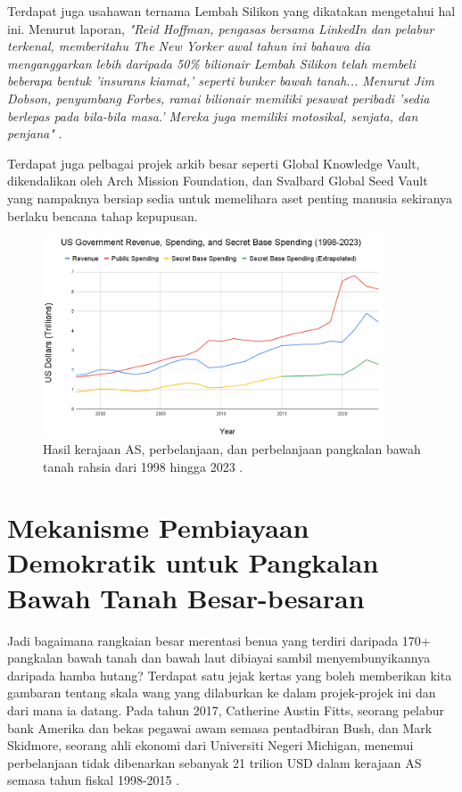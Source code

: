 \documentclass[10pt,twocolumn,letterpaper]{article}
\begin{document}
Terdapat juga usahawan ternama Lembah Silikon yang dikatakan mengetahui hal ini. Menurut laporan, \textit{"Reid Hoffman, pengasas bersama LinkedIn dan pelabur terkenal, memberitahu The New Yorker awal tahun ini bahawa dia menganggarkan lebih daripada 50\% bilionair Lembah Silikon telah membeli beberapa bentuk 'insurans kiamat,' seperti bunker bawah tanah... Menurut Jim Dobson, penyumbang Forbes, ramai bilionair memiliki pesawat peribadi 'sedia berlepas pada bila-bila masa.' Mereka juga memiliki motosikal, senjata, dan penjana"} \cite{28}.

Terdapat juga pelbagai projek arkib besar seperti Global Knowledge Vault, dikendalikan oleh Arch Mission Foundation, \cite{29} dan Svalbard Global Seed Vault \cite{30} yang nampaknya bersiap sedia untuk memelihara aset penting manusia sekiranya berlaku bencana tahap kepupusan.
\begin{figure}[t]
\begin{center}
\includegraphics[width=0.9\textwidth]{govcrop2.png}
\end{center}
   \caption{Hasil kerajaan AS, perbelanjaan, dan perbelanjaan pangkalan bawah tanah rahsia dari 1998 hingga 2023 \cite{19}.}
   \label{fig:9}
\end{figure}
\section{Mekanisme Pembiayaan Demokratik untuk Pangkalan Bawah Tanah Besar-besaran}

Jadi bagaimana rangkaian besar merentasi benua yang terdiri daripada 170+ pangkalan bawah tanah dan bawah laut dibiayai sambil menyembunyikannya daripada hamba hutang? Terdapat satu jejak kertas yang boleh memberikan kita gambaran tentang skala wang yang dilaburkan ke dalam projek-projek ini dan dari mana ia datang. Pada tahun 2017, Catherine Austin Fitts, seorang pelabur bank Amerika dan bekas pegawai awam semasa pentadbiran Bush, dan Mark Skidmore, seorang ahli ekonomi dari Universiti Negeri Michigan, menemui perbelanjaan tidak dibenarkan sebanyak 21 trilion USD dalam kerajaan AS semasa tahun fiskal 1998-2015 \cite{11,12,13}.
\end{document}
